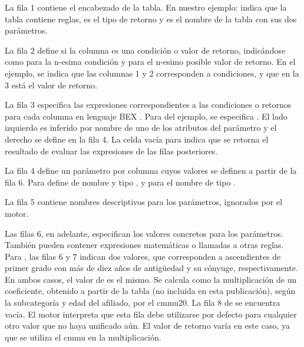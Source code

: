 La fila 1 contiene el encabezado de la tabla.
En nuestro ejemplo:  indica que la tabla contiene reglas,
 es el tipo de retorno y  es el nombre de la tabla con sus dos parámetros.

La fila 2 define si la columna es una condición o valor de retorno, indicándose como   para la n-esima condición y  para el n-esimo posible valor de retorno.
En el ejemplo, se indica que las columnas 1 y 2 corresponden a condiciones, y que en la 3 está el valor de retorno.

La fila 3 especifica las expresiones correspondientes a las condiciones o retornos para cada columna en lenguaje BEX \cite{openl}.
Para  del ejemplo, se especifica .
El lado izquierdo es inferido por nombre de uno de los atributos del parámetro  y el derecho se define en la fila 4.
La celda vacía para  indica que se retorna el resultado de evaluar las expresiones de las filas posteriores.

La fila 4 define un parámetro por columna cuyos valores se definen a partir de la fila 6.
Para  define de nombre  y tipo , y para  el nombre  de tipo .

La fila 5 contiene nombres descriptivos para los parámetros, ignorados por el motor.

Las filas 6, en adelante, especifican los valores concretos para los parámetros.
También pueden contener expresiones matemáticas o llamadas a otras reglas.
%
Para , las filas 6 y 7 indican dos valores, que corresponden a ascendientes de primer grado con más de diez años de antigüedad y su cónyuge, respectivamente.
En ambos casos, el valor de  es el mismo.
Se calcula como la multiplicación de un coeficiente, obtenido a partir de la tabla  (no incluida en esta publicación), según la subcategoría y edad del afiliado, por el \acrshort{cmmu20}.
%
La fila 8 de  se encuentra vacía.
El motor interpreta que esta fila debe utilizarse por defecto para cualquier otro valor que no haya unificado aún.
El valor de retorno varía en este caso, ya que se utiliza el \acrshort{cmmu} en la multiplicación.

